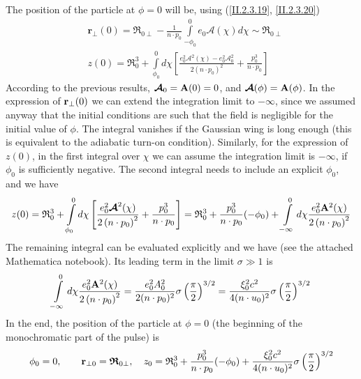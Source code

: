 The position of the particle at $\phi=0$ will be, using (\ref{II.2.3.19}, \ref{II.2.3.20})
\begin{align}
   & \mathbf{r}_{\perp}(0)=\boldsymbol{\mathfrak{R}}_{0 \perp}-\frac{1}{n \cdot p_{0}} \int\limits_{-\phi_0}^{0} e_{0} \boldsymbol{\mathcal { A }}(\chi) d \chi  \sim \boldsymbol{\mathfrak R}_{0 \perp}                                         \\
   & z(0)=\mathfrak{R}_{0}^{3}+\int\limits_{\phi_0}^{0} d \chi\left[\frac{e_{0}^{2} \boldsymbol{\mathcal { A }}^{2}(\chi)-e_{0}^{2} \boldsymbol{\mathcal { A }}_{0}^{2}}{2\left(n \cdot p_{0}\right)^{2}}+\frac{p_{0}^{3}}{n \cdot p_{0}}\right]
\end{align}
According to the previous results, ${\boldsymbol{\mathcal A}}_0 = {\bf A}(0) =0$,  and ${\boldsymbol{\mathcal A}}(\phi) = {\bf A}(\phi) $. In the expression of ${\bf r}_\perp(0)$ we can extend the integration limit to $-\infty$, since we assumed anyway that the initial conditions are such that the field is negligible for the initial value of $\phi$. The integral vanishes if the Gaussian wing is long enough (this is equivalent to the adiabatic turn-on condition). Similarly, for the expression of $z(0)$, in the first integral over $\chi$ we can assume the integration limit is $-\infty$, if $\phi_0$ is sufficiently negative. The second integral needs to include an explicit $\phi_0$, and we have
\begin{align}
  z(0) = \mathfrak{R}_{0}^{3}+\int\limits_{\phi_0}^{0} d \chi\left[\frac{e_{0}^{2} \boldsymbol{\mathcal { A }}^{2}(\chi)}{2\left(n \cdot p_{0}\right)^{2}}+\frac{p_{0}^{3}}{n \cdot p_{0}}\right] = \mathfrak{R}_{0}^{3} + \frac{p_0^3}{n\cdot p_0}(-\phi_0) + \int\limits_{-\infty}^{0} d \chi\frac{e_{0}^{2} {\bf A }^{2}(\chi)}{2\left(n \cdot p_{0}\right)^{2}}
\end{align}
The remaining integral can be evaluated explicitly and we have (see the attached Mathematica notebook). Its leading term in the limit $\sigma\gg 1$ is
\begin{align}
  \int\limits_{-\infty}^{0} d \chi\frac{e_{0}^{2} {\bf A }^{2}(\chi)}{2\left(n \cdot p_{0}\right)^{2}} = \frac{e_0^2A_0^2}{2(n\cdot p_0)^2}\sigma\left(\frac{\pi}2\right)^{3/2}=\frac{\xi_0^2 c^2}{4(n\cdot u_0)^2}\sigma\left(\frac{\pi}2\right)^{3/2}
\end{align}
In the end, the position of the particle at $\phi=0$ (the beginning of the monochromatic part of the pulse) is
\begin{align}
  \phi_0 = 0,\qquad {\bf r}_{\perp0}  = {\boldsymbol{\mathfrak R}}_{0 \perp}, \quad z_0 = \mathfrak{R}_{0}^{3} + \frac{p_0^3}{n\cdot p_0}(-\phi_0) + \frac{\xi_0^2 c^2}{4(n\cdot u_0)^2}\sigma\left(\frac{\pi}2\right)^{3/2}
\end{align}

